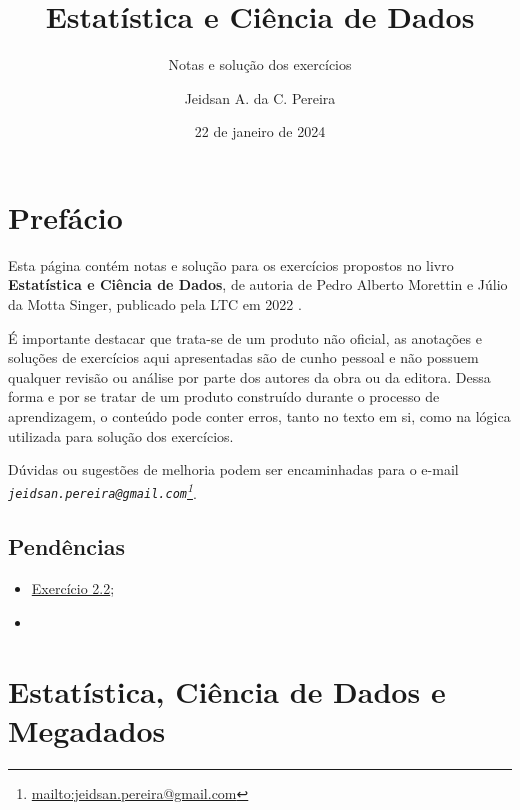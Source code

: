 \documentclass[
]{latex/krantz}
\title{Estatística e Ciência de Dados}
\subtitle{Notas e solução dos exercícios}
\author{Jeidsan A. da C. Pereira}
\date{22 de janeiro de 2024}
\providecommand{\tightlist}{%
  \setlength{\itemsep}{0pt}\setlength{\parskip}{0pt}}
\renewcommand{\href}[2]{#2\footnote{\url{#1}}}
\theoremstyle{definition}
\theoremstyle{definition}
\theoremstyle{definition}
\theoremstyle{definition}
\theoremstyle{remark}
\begin{document}
\maketitle

\thispagestyle{empty}
\begin{center}
\end{center}

\setlength{\abovedisplayskip}{-5pt}
\setlength{\abovedisplayshortskip}{-5pt}

{
\setcounter{tocdepth}{1}
\tableofcontents
}
\hypertarget{prefuxe1cio}{%
\chapter*{Prefácio}\label{prefuxe1cio}}

Esta página contém notas e solução para os exercícios propostos no livro \textbf{Estatística e Ciência de Dados}, de autoria de Pedro Alberto Morettin e Júlio da Motta Singer, publicado pela LTC em 2022 \citep{MorettinSinger2022}.

É importante destacar que trata-se de um produto não oficial, as anotações e soluções de exercícios aqui apresentadas são de cunho pessoal e não possuem qualquer revisão ou análise por parte dos autores da obra ou da editora. Dessa forma e por se tratar de um produto construído durante o processo de aprendizagem, o conteúdo pode conter erros, tanto no texto em si, como na lógica utilizada para solução dos exercícios.

Dúvidas ou sugestões de melhoria podem ser encaminhadas para o e-mail \emph{\href{mailto:jeidsan.pereira@gmail.com}{\nolinkurl{jeidsan.pereira@gmail.com}}}.

\hypertarget{penduxeancias}{%
\section*{Pendências}\label{penduxeancias}}

\begin{itemize}
\tightlist
\item
  \protect\hyperlink{exr2-2}{Exercício 2.2};
\item
\end{itemize}

\mainmatter

\hypertarget{estatuxedstica-ciuxeancia-de-dados-e-megadados}{%
\chapter{Estatística, Ciência de Dados e Megadados}\label{estatuxedstica-ciuxeancia-de-dados-e-megadados}}
\end{document}
